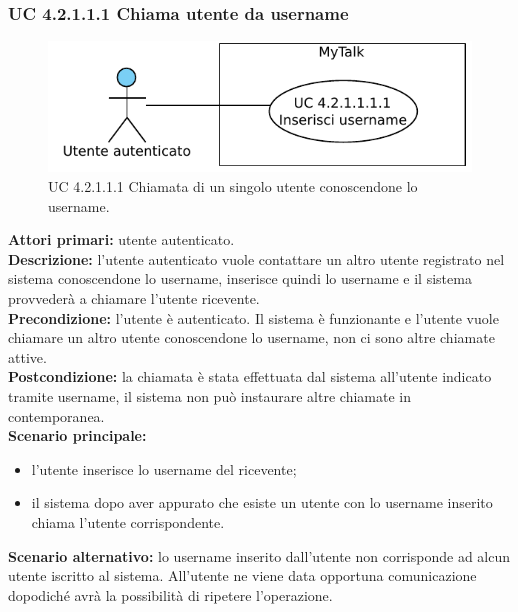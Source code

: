 \subsubsection{UC 4.2.1.1.1 Chiama utente da username}

\begin{figure}[htbp]
\centering
\includegraphics[scale=0.7]{./casi_uso/UC4-2-1-1-1.pdf}
\caption{UC 4.2.1.1.1 Chiamata di un singolo utente conoscendone lo username.}
\end{figure}

\noindent
\textbf{Attori primari:} utente autenticato.\\
\textbf{Descrizione:} l'utente autenticato vuole contattare un altro utente registrato nel sistema conoscendone lo username, inserisce quindi lo username e il sistema provvederà a chiamare l'utente ricevente.\\
\textbf{Precondizione:} l'utente è autenticato. Il sistema è funzionante e l'utente vuole chiamare un altro utente conoscendone lo username, non ci sono altre chiamate attive.\\
\textbf{Postcondizione:} la chiamata è stata effettuata dal sistema all'utente indicato tramite username, il sistema non può instaurare altre chiamate in contemporanea.\\
\textbf{Scenario principale:}
\begin{itemize}
\item l'utente inserisce lo username del ricevente;
\item il sistema dopo aver appurato che esiste un utente con lo username inserito chiama l'utente corrispondente.
\end{itemize}
\textbf{Scenario alternativo:} lo username inserito dall'utente non corrisponde ad alcun utente iscritto al sistema. All'utente ne viene data opportuna comunicazione dopodiché avrà la possibilità di ripetere l'operazione.


